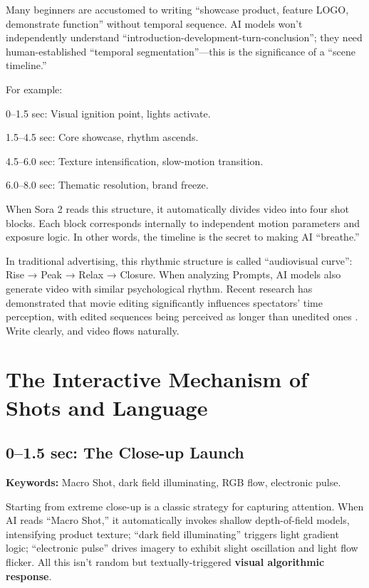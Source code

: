 Many beginners are accustomed to writing ``showcase product, feature LOGO, demonstrate function'' without temporal sequence. AI models won't independently understand ``introduction-development-turn-conclusion''; they need human-established ``temporal segmentation''—this is the significance of a ``scene timeline.''

For example:

\begin{Prompt}
0--1.5 sec: Visual ignition point, lights activate.

1.5--4.5 sec: Core showcase, rhythm ascends.

4.5--6.0 sec: Texture intensification, slow-motion transition.

6.0--8.0 sec: Thematic resolution, brand freeze.
\end{Prompt}

When Sora 2 reads this structure, it automatically divides video into four shot blocks. Each block corresponds internally to independent motion parameters and exposure logic. In other words, the timeline is the secret to making AI ``breathe.''

In traditional advertising, this rhythmic structure is called ``audiovisual curve'': Rise → Peak → Relax → Closure. When analyzing Prompts, AI models also generate video with similar psychological rhythm. Recent research has demonstrated that movie editing significantly influences spectators' time perception, with edited sequences being perceived as longer than unedited ones \citep{kovarski2022movie}. Write clearly, and video flows naturally.

\section{The Interactive Mechanism of Shots and Language}
\label{sec:shots-language-interaction}

\subsection{0--1.5 sec: The Close-up Launch}
\label{subsec:closeup-launch}

\textbf{Keywords:} Macro Shot, dark field illuminating, RGB flow, electronic pulse.

Starting from extreme close-up is a classic strategy for capturing attention. When AI reads ``Macro Shot,'' it automatically invokes shallow depth-of-field models, intensifying product texture; ``dark field illuminating'' triggers light gradient logic; ``electronic pulse'' drives imagery to exhibit slight oscillation and light flow flicker. All this isn't random but textually-triggered \textbf{visual algorithmic response}.

